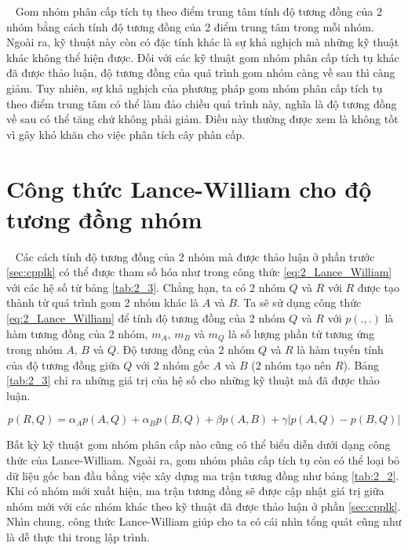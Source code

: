 ~\cite{Vipin-Kumar, AHC, hierarchical-clustering, centroid} Gom nhóm phân cấp tích tụ theo điểm trung tâm tính độ tương đồng của 2 nhóm bằng cách tính độ tương đồng của 2 điểm trung tâm trong mỗi nhóm.
Ngoài ra, kỹ thuật này còn có đặc tính khác là sự khả nghịch mà những kỹ thuật khác không thể hiện được.
Đối với các kỹ thuật gom nhóm phân cấp tích tụ khác đã được thảo luận, độ tương đồng của quá trình gom nhóm càng về sau thì càng giảm.
Tuy nhiên, sự khả nghịch của phương pháp gom nhóm phân cấp tích tụ theo điểm trung tâm có thể làm đảo chiều quá trình này, nghĩa là độ tương đồng về sau có thể tăng chứ không phải giảm.
Điều này thường được xem là không tốt vì gây khó khăn cho việc phân tích cây phân cấp.

\section{Công thức Lance-William cho độ tương đồng nhóm}
~\cite{Vipin-Kumar} Các cách tính độ tương đồng của 2 nhóm mà được thảo luận ở phần trước \ref{sec:cpplk} có thể được tham số hóa như trong công thức \ref{eq:2_Lance_William} với các hệ số từ bảng \ref{tab:2_3}.
Chẳng hạn, ta có 2 nhóm $Q$ và $R$ với $R$ được tạo thành từ quá trình gom 2 nhóm khác là $A$ và $B$.
Ta sẽ sử dụng công thức \ref{eq:2_Lance_William} để tính độ tương đồng của 2 nhóm $Q$ và $R$ với $p(.,.)$ là hàm tương đồng của 2 nhóm, $m_A, \, m_B$ và $m_Q$ là số lượng phần tử tương ứng trong nhóm $A, \, B$ và $Q$.
Độ tương đồng của 2 nhóm $Q$ và $R$ là hàm tuyến tính của độ tương đồng giữa $Q$ với 2 nhóm gốc $A$ và $B$ (2 nhóm tạo nên $R$).
Bảng \ref{tab:2_3} chỉ ra những giá trị của hệ số cho những kỹ thuật mà đã được thảo luận.

\begin{equation}
\label{eq:2_Lance_William}
p(R,Q)=\alpha_Ap(A,Q) + \alpha_Bp(B,Q) + \beta p(A,B) + \gamma |p(A, Q) - p(B, Q)|
\end{equation}

Bất kỳ kỹ thuật gom nhóm phân cấp nào cũng có thể biểu diễn dưới dạng công thức của Lance-William.
Ngoài ra, gom nhóm phân cấp tích tụ còn có thể loại bỏ dữ liệu gốc ban đầu bằng việc xây dựng ma trận tương đồng như bảng \ref{tab:2_2}.
Khi có nhóm mới xuất hiện, ma trận tương đồng sẽ được cập nhật giá trị giữa nhóm mới với các nhóm khác theo kỹ thuật đã được thảo luận ở phần \ref{sec:cpplk}.
Nhìn chung, công thức Lance-William giúp cho ta có cái nhìn tổng quát cũng như là dễ thực thi trong lập trình.

